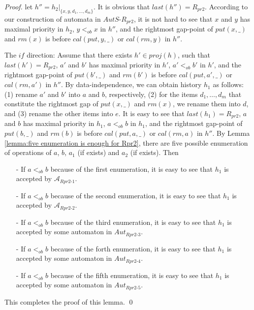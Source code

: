 \documentclass{llncs}
\begin{document}
\begin {proof}
let $h'' = h_2 \vert_{ \{ x,y,d_1,\ldots,d_m \} }$. It is obvious that $\textit{last}(h'') = R_{\textit{pr2}}$. According to our construction of automata in $\textit{AutS-R}_{\textit{pr2}}$, it is not hard to see that $x$ and $y$ has maximal priority in $h_2$, $y <_{\textit{ob}} x$ in $h''$, and the rightmost gap-point of $\textit{put}(x,\_)$ and $\textit{rm}(x)$ is before $\textit{cal}(\textit{put},y,\_)$ or $\textit{cal}(\textit{rm},y)$ in $h''$. %

\noindent The $\textit{if}$ direction: Assume that there exists $h' \in \textit{proj}(h)$, such that $\textit{last}(h') = R_{\textit{pr2}}$, $a'$ and $b'$ has maximal priority in $h'$, $a' <_{\textit{ob}} b'$ in $h'$, and the rightmost gap-point of $\textit{put}(b',\_)$ and $\textit{rm}(b')$ is before $\textit{cal}(\textit{put},a',\_)$ or $\textit{cal}(\textit{rm},a')$ in $h''$. By data-independence, we can obtain history $h_1$ as follows: (1) rename $a'$ and $b'$ into $a$ and $b$, respectively, (2) for the items $d_1,\ldots,d_m$ that constitute the rightmost gap of $\textit{put}(x,\_)$ and $\textit{rm}(x)$, we rename them into $d$, and (3) rename the other items into $e$. It is easy to see that $\textit{last}(h_1) = R_{\textit{pr2}}$, $a$ and $b$ has maximal priority in $h_1$, $a <_{\textit{ob}} b$ in $h_1$, and the rightmost gap-point of $\textit{put}(b,\_)$ and $\textit{rm}(b)$ is before $\textit{cal}(\textit{put},a,\_)$ or $\textit{cal}(\textit{rm},a)$ in $h''$. By Lemma \ref{lemma:five enumeration is enough for Rpr2}, there are five possible enumeration of operations of $a$, $b$, $a_1$ (if exists) and $a_2$ (if exists). Then


\begin{itemize}
\setlength{\itemsep}{0.5pt}
\item[-] If $a <_{\textit{ob}} b$ because of the first enumeration, it is easy to see that $h_1$ is accepted by $\mathcal{A}_{\textit{Rpr2-1}}$.

\item[-] If $a <_{\textit{ob}} b$ because of the second enumeration, it is easy to see that $h_1$ is accepted by $\mathcal{A}_{\textit{Rpr2-2}}$.

\item[-] If $a <_{\textit{ob}} b$ because of the third enumeration, it is easy to see that $h_1$ is accepted by some automaton in $\textit{Aut}_{\textit{Rpr2-3}}$.

\item[-] If $a <_{\textit{ob}} b$ because of the forth enumeration, it is easy to see that $h_1$ is accepted by some automaton in $\textit{Aut}_{\textit{Rpr2-4}}$.

\item[-] If $a <_{\textit{ob}} b$ because of the fifth enumeration, it is easy to see that $h_1$ is accepted by some automaton in $\textit{Aut}_{\textit{Rpr2-5}}$.
\end{itemize}

This completes the proof of this lemma. \qed
\end {proof}
\end{document}
